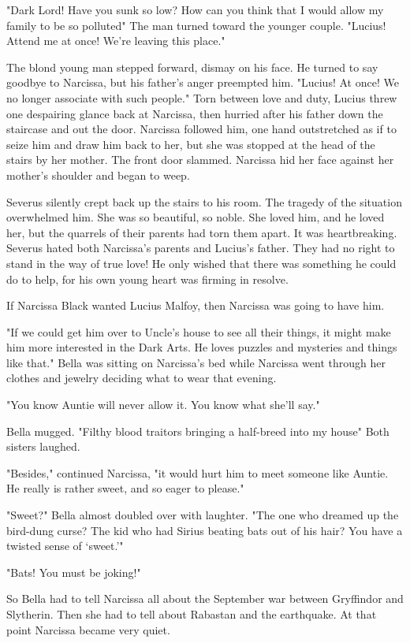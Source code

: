 "Dark Lord! Have you sunk so low? How can you think that I would allow my family to be so polluted{\el}" The man turned toward the younger couple. "Lucius! Attend me at once! We're leaving this place."

The blond young man stepped forward, dismay on his face. He turned to say goodbye to Narcissa, but his father's anger preempted him. "Lucius! At once! We no longer associate with such people." Torn between love and duty, Lucius threw one despairing glance back at Narcissa, then hurried after his father down the staircase and out the door. Narcissa followed him, one hand outstretched as if to seize him and draw him back to her, but she was stopped at the head of the stairs by her mother. The front door slammed. Narcissa hid her face against her mother's shoulder and began to weep.

Severus silently crept back up the stairs to his room. The tragedy of the situation overwhelmed him. She was so beautiful, so noble. She loved him, and he loved her, but the quarrels of their parents had torn them apart. It was heartbreaking. Severus hated both Narcissa's parents and Lucius's father. They had no right to stand in the way of true love! He only wished that there was something he could do to help, for his own young heart was firming in resolve.

If Narcissa Black wanted Lucius Malfoy, then Narcissa was going to have him.

"If we could get him over to Uncle's house to see all their things, it might make him more interested in the Dark Arts. He loves puzzles and mysteries and things like that." Bella was sitting on Narcissa's bed while Narcissa went through her clothes and jewelry deciding what to wear that evening.

"You know Auntie will never allow it. You know what she'll say."

Bella mugged. "Filthy blood traitors bringing a half-breed into my house{\el}" Both sisters laughed.

"Besides," continued Narcissa, "it would hurt him to meet someone like Auntie. He really is rather sweet, and so eager to please."

"Sweet?" Bella almost doubled over with laughter. "The one who dreamed up the bird-dung curse? The kid who had Sirius beating bats out of his hair? You have a twisted sense of `sweet.'"

"Bats! You must be joking!"

So Bella had to tell Narcissa all about the September war between Gryffindor and Slytherin. Then she had to tell about Rabastan and the earthquake. At that point Narcissa became very quiet.


